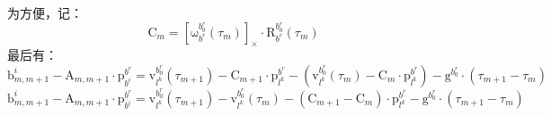 \documentclass[12pt, onecolumn]{article}
\newcommand\liehat[1]{\left[ #1 \right]_\times}
\newcommand\bsm[1]{\boldsymbol{\mathrm{#1}}}
\newcommand\rotation[2]{{\bsm{R}_{#1}^{#2}}}
\newcommand\angvel[2]{{\bsm{\omega}_{#1}^{#2}}}
\newcommand\translation[2]{{\bsm{p}_{#1}^{#2}}}
\newcommand\linvel[2]{{\bsm{v}_{#1}^{#2}}}
\newcommand\gravity[1]{{\bsm{g}^{#1}}}
\begin{document}
	为方便，记：
	\begin{equation}
	\bsm{C}_m=\liehat{\angvel{b^r}{b^r_0}(\tau_m)}\cdot\rotation{b^r}{b^r_0}(\tau_m)
	\end{equation}
	最后有：
	\begin{equation}
	\bsm{b}^i_{m,m+1}-\bsm{A}_{m,m+1}\cdot\translation{b^i}{b^r}=
	\linvel{l^k}{b^r_0}(\tau_{m+1})-\bsm{C}_{m+1}\cdot\translation{l^k}{b^r}
	-\left(\linvel{l^k}{b^r_0}(\tau_{m})-\bsm{C}_{m}\cdot\translation{l^k}{b^r} \right) -\gravity{b^r_0}\cdot\left(\tau_{m+1}-\tau_m \right) 
	\end{equation}
	\begin{equation}
	\bsm{b}^i_{m,m+1}-\bsm{A}_{m,m+1}\cdot\translation{b^i}{b^r}=
	\linvel{l^k}{b^r_0}(\tau_{m+1})-\linvel{l^k}{b^r_0}(\tau_{m})
	-\left( \bsm{C}_{m+1}-\bsm{C}_{m}\right) \cdot\translation{l^k}{b^r}
	-\gravity{b^r_0}\cdot\left(\tau_{m+1}-\tau_m \right) 
	\end{equation}
	
\end{document}
